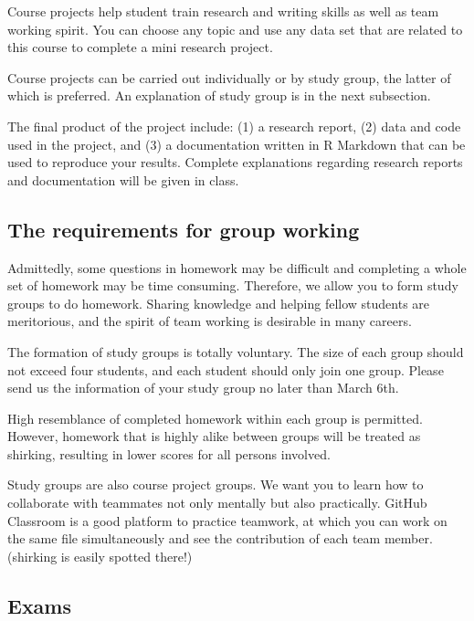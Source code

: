 \documentclass[a4paper,11pt]{article}
\begin{document}
Course projects help student train research and writing skills as well
as team working spirit. You can choose any topic and use any data set
that are related to this course to complete a mini research
project.

Course projects can be carried out individually or by study group, the
latter of which is preferred. An explanation of study group is in the
next subsection.

The final product of the project include: (1) a research report, (2)
data and code used in the project, and (3) a documentation written in
R Markdown that can be used to reproduce your results. Complete
explanations regarding research reports and documentation will be
given in class.

\subsection*{The requirements for group working}
\label{sec:org2775303}

Admittedly, some questions in homework may be difficult and completing
a whole set of homework may be time consuming. Therefore, we allow you
to form study groups to do homework. Sharing knowledge and helping
fellow students are meritorious, and the spirit of team working is
desirable in many careers.

The formation of study groups is totally voluntary. The size of each
group should not exceed four students, and each student should only
join one group. Please send us the information of your study group no
later than March 6th.

High resemblance of completed homework within each group is
permitted. However, homework that is highly alike between groups will
be treated as shirking, resulting in lower scores for all persons
involved.

Study groups are also course project groups. We want you to learn how
to collaborate with teammates not only mentally but also
practically. GitHub Classroom is a good platform to practice teamwork,
at which you can work on the same file simultaneously and see the
contribution of each team member. (shirking is easily spotted there!)

\subsection*{Exams}
\label{sec:orgde509c7}
\end{document}
